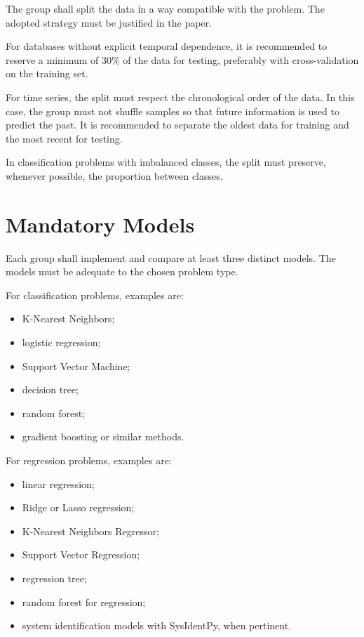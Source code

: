 \documentclass[a4paper]{ifacconf}
\begin{document}
The group shall split the data in a way compatible with the problem. The adopted strategy must be justified in the paper.

For databases without explicit temporal dependence, it is recommended to reserve a minimum of 30\% of the data for testing, preferably with cross-validation on the training set.

For time series, the split must respect the chronological order of the data. In this case, the group must not shuffle samples so that future information is used to predict the past. It is recommended to separate the oldest data for training and the most recent for testing.

In classification problems with imbalanced classes, the split must preserve, whenever possible, the proportion between classes.

\section{Mandatory Models}

Each group shall implement and compare at least three distinct models. The models must be adequate to the chosen problem type.

For classification problems, examples are:
\begin{itemize}
    \item K-Nearest Neighbors;
    \item logistic regression;
    \item Support Vector Machine;
    \item decision tree;
    \item random forest;
    \item gradient boosting or similar methods.
\end{itemize}

For regression problems, examples are:
\begin{itemize}
    \item linear regression;
    \item Ridge or Lasso regression;
    \item K-Nearest Neighbors Regressor;
    \item Support Vector Regression;
    \item regression tree;
    \item random forest for regression;
    \item system identification models with SysIdentPy, when pertinent.
\end{itemize}
\end{document}
